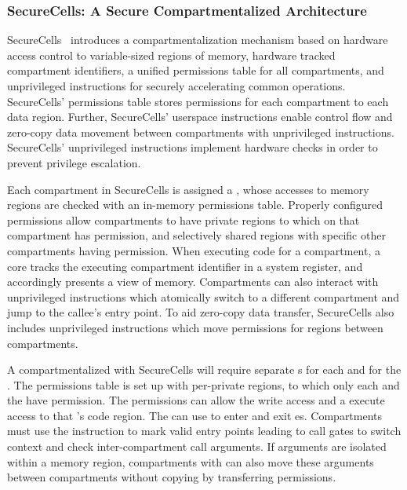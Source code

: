 \subsubsection{SecureCells: A Secure Compartmentalized Architecture}
SecureCells~\cite{BhattacharyyaHLGSFP23} introduces a compartmentalization 
mechanism based on hardware
access control to variable-sized regions of memory, hardware tracked
compartment identifiers, a unified permissions table for all compartments,
and unprivileged instructions for securely accelerating common operations.
SecureCells' permissions table stores permissions for each compartment to
each data region.
Further, SecureCells' userspace instructions enable control flow and
zero-copy data movement between compartments with unprivileged instructions.
SecureCells' unprivileged instructions implement hardware checks in order
to prevent privilege escalation.

Each compartment in SecureCells is assigned a \secdiv{}, whose accesses
to memory regions are checked with an in-memory permissions table.
Properly configured permissions allow compartments to have private regions
to which on that compartment has permission, and selectively shared regions
with specific other compartments having permission. 
When executing code for a compartment, a core tracks the executing compartment
identifier in a system register, and accordingly presents a view of memory.
Compartments can also interact with unprivileged  instructions
which atomically  switch to a different compartment and jump to the callee's
entry point.
To aid zero-copy data transfer, SecureCells also includes unprivileged instructions
which move permissions for regions between compartments.

A \browser compartmentalized with SecureCells will require separate
\secdiv{}s for each \sandbox and for the \renderer.
The permissions table is set up with per-\sandbox private regions, to which
only each \sandbox and the \renderer have permission.
The permissions can allow the \renderer write access and a \sandbox
execute access to that \sandbox's code region.
The \renderer can use  to enter and exit \sandbox{}es.
Compartments must use the  instruction to mark valid entry points
leading to call gates to switch context and check inter-compartment call
arguments.
If arguments are isolated within a memory region, compartments with 
\seccells can also move these arguments between compartments without copying
by transferring permissions.


